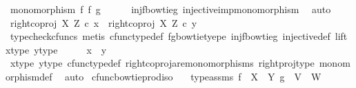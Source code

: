 \begin{isabellebody}
\ {\isachardoublequoteopen}monomorphism\ {\isacharparenleft}{\kern0pt}f\ {\isasymbowtie}\isactrlsub f\ g{\isacharparenright}{\kern0pt}{\isachardoublequoteclose}\isanewline
\ \ \ \ \isamarkupfalse%
\ inj{\isacharunderscore}{\kern0pt}f{\isacharunderscore}{\kern0pt}bowtie{\isacharunderscore}{\kern0pt}g\ injective{\isacharunderscore}{\kern0pt}imp{\isacharunderscore}{\kern0pt}monomorphism\ \isamarkupfalse%
\ auto\isanewline
\ \ \isamarkupfalse%
\ \isamarkupfalse%
\ {\isachardoublequoteopen}right{\isacharunderscore}{\kern0pt}coproj\ X\ Z\ {\isasymcirc}\isactrlsub c\ x\ {\isacharequal}{\kern0pt}\ right{\isacharunderscore}{\kern0pt}coproj\ X\ Z\ {\isasymcirc}\isactrlsub c\ y{\isachardoublequoteclose}\isanewline
\ \ \ \ \isamarkupfalse%
\ {\isacharparenleft}{\kern0pt}typecheck{\isacharunderscore}{\kern0pt}cfuncs{\isacharcomma}{\kern0pt}\ metis\ cfunc{\isacharunderscore}{\kern0pt}type{\isacharunderscore}{\kern0pt}def\ fg{\isacharunderscore}{\kern0pt}bowtie{\isacharunderscore}{\kern0pt}tyepe\ inj{\isacharunderscore}{\kern0pt}f{\isacharunderscore}{\kern0pt}bowtie{\isacharunderscore}{\kern0pt}g\ injective{\isacharunderscore}{\kern0pt}def\ lift\ x{\isacharunderscore}{\kern0pt}type{}\ y{\isacharunderscore}{\kern0pt}type{}{\isacharparenright}{\kern0pt}\isanewline
\ \ \isamarkupfalse%
\ \isamarkupfalse%
\ {\isachardoublequoteopen}x\ {\isacharequal}{\kern0pt}\ y{\isachardoublequoteclose}\isanewline
\ \ \ \ \isamarkupfalse%
\ x{\isacharunderscore}{\kern0pt}type{}\ y{\isacharunderscore}{\kern0pt}type{}\ cfunc{\isacharunderscore}{\kern0pt}type{\isacharunderscore}{\kern0pt}def\ right{\isacharunderscore}{\kern0pt}coproj{\isacharunderscore}{\kern0pt}are{\isacharunderscore}{\kern0pt}monomorphisms\ right{\isacharunderscore}{\kern0pt}proj{\isacharunderscore}{\kern0pt}type\ monomorphism{\isacharunderscore}{\kern0pt}def\ \isamarkupfalse%
\ auto\isanewline
{}\isamarkupfalse%
%
\endisatagproof
{\isafoldproof}%
%
\isadelimproof
\isanewline
%
\endisadelimproof
\isanewline
{}\isamarkupfalse%
\ cfunc{\isacharunderscore}{\kern0pt}bowtieprod{\isacharunderscore}{\kern0pt}iso{\isacharcolon}{\kern0pt}\isanewline
\ \ \ type{\isacharunderscore}{\kern0pt}assms{\isacharcolon}{\kern0pt}\ {\isachardoublequoteopen}f\ {\isacharcolon}{\kern0pt}\ X\ {\isasymrightarrow}\ Y{\isachardoublequoteclose}\ {\isachardoublequoteopen}g\ {\isacharcolon}{\kern0pt}\ V\ {\isasymrightarrow}\ W{\isachardoublequoteclose}\isanewline

\end{isabellebody}
